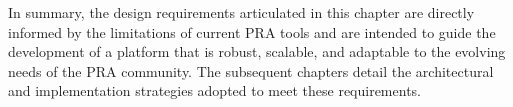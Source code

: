 In summary, the design requirements articulated in this chapter are directly informed by the limitations of current PRA tools and are intended to guide the development of a platform that is robust, scalable, and adaptable to the evolving needs of the PRA community. The subsequent chapters detail the architectural and implementation strategies adopted to meet these requirements.